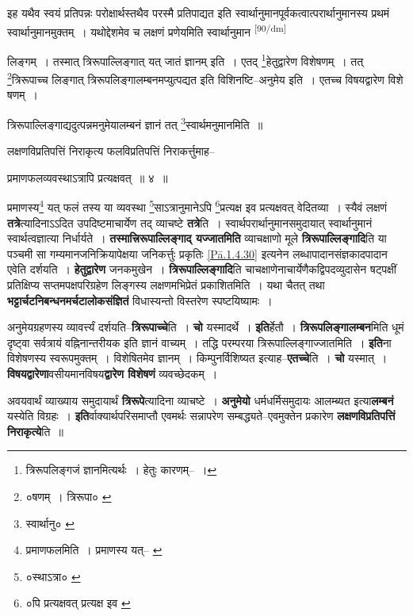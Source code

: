 \documentclass[article,12pt,a4paper]{memoir}
\begin{document}
	  \pstart इह यथैव स्वयं प्रतिपन्नः परोक्षार्थस्तथैव परस्मै प्रतिपाद्यत इति स्वार्थानुमानपूर्वकत्वात्परार्थानुमानस्य प्रथमं स्वार्थानुमानमुक्तम् । यथोद्देशमेव च लक्षणं प्रणेयमिति स्वार्थानुमान  \leavevmode\textsuperscript{\rmlatinfont\tiny [90/dm]} 
	  
	लिङ्गम् । तस्मात् त्रिरूपाल्लिङ्गात् यत् जातं ज्ञानम् इति । एतद् \footnote{त्रिरूपलिङ्गजं ज्ञानमित्यर्थः । हेतुः कारणम्--\cite{dp-msD-n} ।}हेतुद्वारेण विशेषणम् । तत् \footnote{०षणम् । त्रिरूपा० \cite{dp-msC} \cite{dp-msD}}त्रिरूपाच्च लिङ्गात् त्रिरूपलिङ्गालम्बनमप्युत्पद्यत इति विशिनष्टि--अनुमेय इति । एतच्च विषयद्वारेण विशे षणम् । 
	  
	त्रिरूपाल्लिङ्गाद्यदुत्पन्नमनुमेयालम्बनं ज्ञानं तत् \footnote{स्वार्थानु० \cite{dp-msD}}स्वार्थमनुमानमिति ॥ 
	  
	लक्षणविप्रतिपत्तिं निराकृत्य फलविप्रतिपत्तिं निराकर्त्तुमाह-- 
	  
	प्रमाणफलव्यवस्थाऽत्रापि प्रत्यक्षवत् ॥ ४ ॥ 
	  
	प्रमाणस्य\footnote{प्रमाणफलमिति । प्रमाणस्य यत्--\cite{dp-msB} \cite{dp-msC} \cite{dp-msD}} यत् फलं तस्य या व्यवस्था \footnote{०स्थाऽत्रा० \cite{dp-msA} \cite{dp-msB} \cite{dp-edP} \cite{dp-edH} \cite{dp-edE}}साऽत्रानुमानेऽपि \footnote{०पि प्रत्यक्षवत् प्रत्यक्ष इव \cite{dp-edP} \cite{dp-edH} \cite{dp-edE}}प्रत्यक्ष इव प्रत्यक्षवत् वेदितव्या । स्यैवं लक्षणं \textbf{तत्रे}त्यादिनाऽऽदित उपदिष्टमाचार्येण तद् व्याचष्टे \textbf{तत्रे}ति । स्वार्थपरार्थानुमानसमुदायात् स्वार्थानुमानं स्वार्थत्वज्ञात्या निर्धार्यते । \textbf{तस्मात्त्रिरूपाल्लिङ्गाद् यज्जातमिति} व्याचक्षाणो मूले \textbf{त्रिरूपाल्लिङ्गादि}ति या पञ्चमी सा गम्यमानजनिक्रियापेक्षया जनिकर्त्तुः प्रकृतिः \cref{Pā.1.4.30} इत्यनेन लब्धापादानसंज्ञकादपादान एवेति दर्शयति । \textbf{हेतुद्वारेण} जनकमुखेन । \textbf{त्रिरूपाल्लिङ्गादि}ति चाचक्षाणेनाचार्येणैकद्विपदव्युदासेन षट्पक्षीं प्रतिक्षिप्य सप्तमपक्षपरिग्रहेण लिङ्गस्य लक्षणमभिप्रेतं प्रकाशितमिति । यथा चैतत् तथा \textbf{भट्टार्चटनिबन्धनमर्चटालोकसंज्ञितं} विधास्यन्तो विस्तरेण स्पष्टयिष्यामः ।
	\pend
      

	  \pstart अनुमेयग्रहणस्य व्यावर्त्त्यं दर्शयति--\textbf{त्रिरूपाच्चे}ति । \textbf{चो} यस्मादर्थे । \textbf{इति}र्हेतौ । \textbf{त्रिरूपलिङ्गालम्बन}मिति धूमं दृष्ट्वा सर्वत्रायं वह्निनान्तरीयक इति ज्ञानं वाच्यम् । तद्धि परम्परया त्रिरूपाल्लिङ्गाज्जातमिति । \textbf{इति}ना विशेषणस्य स्वरूपमुक्तम् । विशेषितमेव ज्ञानम् । किम्पुनर्विशिष्यत इत्याह--\textbf{एतच्चे}ति । \textbf{चो} यस्मात् । \textbf{विषयद्वारेणा}वसीयमानविषय\textbf{द्वारेण विशेषणं} व्यवच्छेदकम् ।
	\pend
      

	  \pstart अवयवार्थं व्याख्याय समुदायार्थं \textbf{त्रिरूपे}त्यादिना व्याचष्टे । \textbf{अनुमेयो} धर्मधर्मिसमुदायः आलम्ब्यत इत्या\textbf{लम्बनं} यस्येति विग्रहः । \textbf{इति}र्वाक्यार्थपरिसमाप्तौ एवमर्थः सन्नापरेण सम्बद्ध्यते--एवमुक्तेन प्रकारेण \textbf{लक्षणविप्रतिपत्तिं निराकृत्ये}ति ॥
	\pend
      
\end{document}
